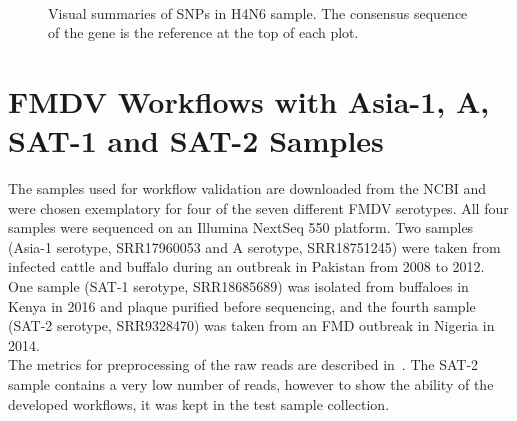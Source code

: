 \begin{figure} %
    \centering
     \\
    \caption[Visual summaries of SNPs in H4N6 sample.]{Visual summaries of SNPs in H4N6 sample. The consensus sequence of the gene is the reference at the top of each plot.}
\label{fig:4-aiv-snipit-s4}
\end{figure}

\section{FMDV Workflows with Asia-1, A, SAT-1 and SAT-2 Samples}
The samples used for workflow validation are downloaded from the \ac{NCBI} and were chosen exemplatory for four of the seven different \ac{FMDV} serotypes. All four samples were sequenced on an Illumina NextSeq 550 platform. Two samples (Asia-1 serotype, SRR17960053 and A serotype, SRR18751245) were taken from infected cattle and buffalo during an outbreak in Pakistan from 2008 to 2012. One sample (SAT-1 serotype, SRR18685689) was isolated from buffaloes in Kenya in 2016 and plaque purified before sequencing, and the fourth sample (SAT-2 serotype, SRR9328470) was taken from an \ac{FMD} outbreak in Nigeria in 2014. \\
The metrics for preprocessing of the raw reads are described in~. The SAT-2 sample contains a very low number of reads, however to show the ability of the developed workflows, it was kept in the test sample collection. 
\\


